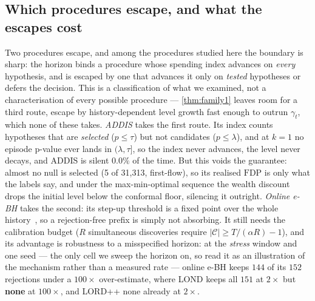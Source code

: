 \documentclass[conference]{IEEEtran}
\newcommand{\Cal}{\mathcal{C}}
\newcommand{\nCal}{\lvert\Cal\rvert}
\newcommand{\FDP}{\mathrm{FDP}}
\begin{document}
\subsection{Which procedures escape, and what the escapes cost}\label{sec:escapes}

Two procedures escape, and among the procedures studied here the boundary is sharp: the horizon binds
a procedure whose spending index advances on \emph{every} hypothesis, and is escaped by one that
advances it only on \emph{tested} hypotheses or defers the decision. This is a classification of
what we examined, not a characterisation of every possible procedure --- \cref{thm:family1} leaves
room for a third route, escape by history-dependent level growth fast enough to outrun $\gamma_t$,
which none of these takes. \emph{ADDIS} takes the first route. Its index counts
hypotheses that are \emph{selected} ($p\le\tau$) but not candidates ($p\le\lambda$), and at $k=1$ no
episode p-value ever lands in $(\lambda,\tau]$, so the index never advances, the level never decays,
and ADDIS is silent $0.0\%$ of the time. But this voids the guarantee: almost no null is selected
(5 of 31,313, first-flow), so its realised $\FDP$ is only what the labels say, and under the max-min-optimal
sequence the wealth discount drops the initial level below the conformal floor, silencing it outright.
\emph{Online e-BH} takes the second: its step-up threshold is a fixed point over the whole
history~\cite{xu2024elond,wang2022evaluebh,fischer2025onlineebh}, so a rejection-free prefix is
simply not absorbing. It still needs the calibration budget ($R$ simultaneous discoveries require
$\nCal \ge T/(\alpha R)-1$), and its advantage is robustness to a misspecified horizon: at the
\emph{stress} window and one seed --- the only cell we sweep the horizon on, so read it as an
illustration of the mechanism rather than a measured rate --- online e-BH keeps $144$ of its $152$
rejections under a $100\times$ over-estimate, where LOND keeps all $151$ at $2\times$ but
\textbf{none} at $100\times$, and LORD++ none already at $2\times$.
\end{document}
